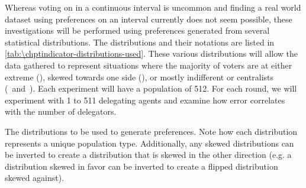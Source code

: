 Whereas voting on in a continuous interval is uncommon and finding a real world dataset
using preferences on an interval currently does not seem possible, these investigations
will be performed using preferences generated from several statistical distributions.
The distributions and their notations are listed in \autoref{tab:\chptindicator-distributions-used}.
These various distributions will allow the data gathered to represent situations
where the majority of voters are at either extreme (),
skewed towards one side (), or mostly indifferent or centralists
(\gaussiandist~and~).
Each experiment will have a population of 512.
For each round, we will experiment with 1 to 511 delegating agents and examine how
error correlates with the number of delegators.

\begin{table}[!htbp]
    \renewcommand{\arraystretch}{1.3}

    \caption{
        The distributions to be used to generate preferences.
        Note how each distribution represents a unique population type.
        Additionally, any skewed distributions can be inverted to create a
        distribution that is skewed in the other direction (e.g. a distribution
        skewed in favor can be inverted to create a flipped distribution skewed
        against).
    }
    \label{tab:\chptindicator-distributions-used}

    \centering
    
\end{table}
